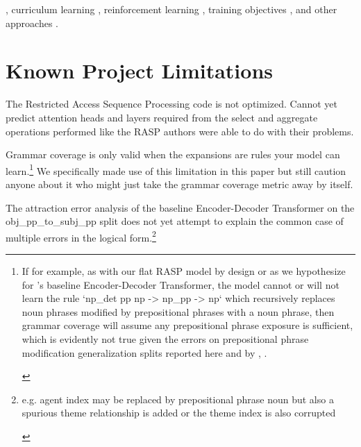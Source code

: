 \documentclass[11pt]{article}
\begin{document}
{\begin{footnotesize}
\end{footnotesize}}, curriculum learning \cite{10.1145/1553374.1553380}, reinforcement learning \cite{Ranzato2015}, training objectives \cite{10.1162/tacl_a_00733}, and other approaches \cite{Csordas2021} \cite{ontanon-etal-2022-making}.

\clearpage
\section*{Known Project Limitations}

The Restricted Access Sequence Processing code is not optimized. Cannot yet predict attention heads and layers required from the select and aggregate operations performed like the RASP authors \cite{Weiss2021} were able to do with their problems.

Grammar coverage \cite{fuzzingbook2023:GrammarCoverageFuzzer} is only valid when the expansions are rules your model can learn.\footnote{\begin{footnotesize}If for example, as with our flat RASP model by design or as we hypothesize for \cite{Wu2023}'s baseline Encoder-Decoder Transformer, the model cannot or will not learn the rule `np\_det pp np -> np\_pp -> np` which recursively replaces noun phrases modified by prepositional phrases with a noun phrase, then grammar coverage will assume any prepositional phrase exposure is sufficient, which is evidently not true given the errors on prepositional phrase modification generalization splits reported here and by \cite{Wu2023}, \cite{KimLinzen2020}.
\end{footnotesize}
} We specifically made use of this limitation in this paper but still caution anyone about it who might just take the grammar coverage metric away by itself.

The attraction error analysis of the \cite{Wu2023} baseline Encoder-Decoder Transformer on the obj\_pp\_to\_subj\_pp split does not yet attempt to explain the common case of multiple errors in the logical form.\footnote{\begin{footnotesize}e.g. agent index may be replaced by prepositional phrase noun but also a spurious theme relationship is added or the theme index is also corrupted\end{footnotesize}}
\end{document}
